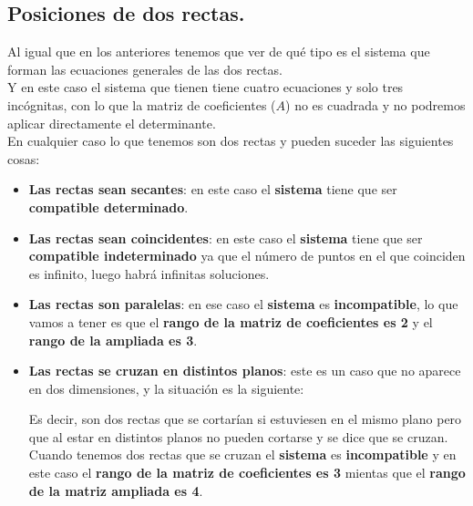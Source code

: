 \documentclass[a4paper,11pt,answers]{exam}
\begin{document}
\subsection{Posiciones de dos rectas.}
Al igual que en los anteriores tenemos que ver de qué tipo es el sistema que forman las ecuaciones generales de las dos rectas.\\
Y en este caso el sistema que tienen tiene cuatro ecuaciones y solo tres incógnitas, con lo que la matriz de coeficientes ($A$) no es cuadrada y no podremos aplicar directamente el determinante.\\
En cualquier caso lo que tenemos son dos rectas y pueden suceder las siguientes cosas:
\begin{itemize}
\item \textbf{Las rectas sean secantes}: en este caso el \textbf{sistema} tiene que ser \textbf{compatible determinado}.
\item \textbf{Las rectas sean coincidentes}: en este caso el \textbf{sistema} tiene que ser \textbf{compatible indeterminado} ya que el número de puntos en el que coinciden es infinito, luego habrá infinitas soluciones.
\item \textbf{Las rectas son paralelas}: en ese caso el \textbf{sistema} es \textbf{incompatible}, lo que vamos a tener es que el \textbf{rango de la matriz de coeficientes es 2} y el \textbf{rango de la ampliada es 3}.
\item \textbf{Las rectas se cruzan en distintos planos}: este es un caso que no aparece en dos dimensiones, y la situación es la siguiente:
  \begin{center}
  \end{center}
  Es decir, son dos rectas que se cortarían si estuviesen en el mismo plano pero que al estar en distintos planos no pueden cortarse y se dice que se cruzan.\\
  Cuando tenemos dos rectas que se cruzan el \textbf{sistema} es \textbf{incompatible} y en este caso el \textbf{rango de la matriz de coeficientes es 3} mientas que el \textbf{rango de la matriz ampliada es 4}.
\end{itemize}
\end{document}
